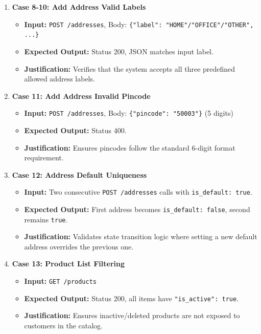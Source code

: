 \documentclass{article}
\begin{document}
\begin{enumerate}
    \item \textbf{Case 8-10: Add Address Valid Labels}
    \begin{itemize}
        \item \textbf{Input:} \texttt{POST /addresses}, Body: \texttt{\{"label": "HOME"/"OFFICE"/"OTHER", ...\}}
        \item \textbf{Expected Output:} Status 200, JSON matches input label.
        \item \textbf{Justification:} Verifies that the system accepts all three predefined allowed address labels.
    \end{itemize}

    \item \textbf{Case 11: Add Address Invalid Pincode}
    \begin{itemize}
        \item \textbf{Input:} \texttt{POST /addresses}, Body: \texttt{\{"pincode": "50003"\}} (5 digits)
        \item \textbf{Expected Output:} Status 400.
        \item \textbf{Justification:} Ensures pincodes follow the standard 6-digit format requirement.
    \end{itemize}

    \item \textbf{Case 12: Address Default Uniqueness}
    \begin{itemize}
        \item \textbf{Input:} Two consecutive \texttt{POST /addresses} calls with \texttt{is_default: true}.
        \item \textbf{Expected Output:} First address becomes \texttt{is_default: false}, second remains \texttt{true}.
        \item \textbf{Justification:} Validates state transition logic where setting a new default address overrides the previous one.
    \end{itemize}

    \item \textbf{Case 13: Product List Filtering}
    \begin{itemize}
        \item \textbf{Input:} \texttt{GET /products}
        \item \textbf{Expected Output:} Status 200, all items have \texttt{"is_active": true}.
        \item \textbf{Justification:} Ensures inactive/deleted products are not exposed to customers in the catalog.
    \end{itemize}


\end{enumerate}
\end{document}
